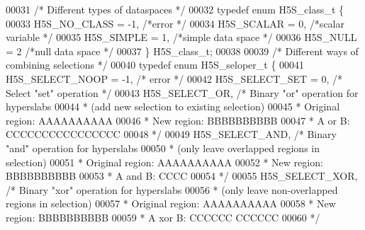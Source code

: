 \begin{DoxyCode}
00031 \textcolor{comment}{/* Different types of dataspaces */}
00032 \textcolor{keyword}{typedef} \textcolor{keyword}{enum} H5S\_class\_t \{
00033     H5S\_NO\_CLASS         = -1,  \textcolor{comment}{/*error                                      */}
00034     H5S\_SCALAR           = 0,   \textcolor{comment}{/*scalar variable                            */}
00035     H5S\_SIMPLE           = 1,   \textcolor{comment}{/*simple data space                          */}
00036     H5S\_NULL             = 2    \textcolor{comment}{/*null data space                            */}
00037 \} H5S\_class\_t;
00038 
00039 \textcolor{comment}{/* Different ways of combining selections */}
00040 \textcolor{keyword}{typedef} \textcolor{keyword}{enum} H5S\_seloper\_t \{
00041     H5S\_SELECT\_NOOP      = -1,  \textcolor{comment}{/* error                                     */}
00042     H5S\_SELECT\_SET       = 0,   \textcolor{comment}{/* Select "set" operation            */}
00043     H5S\_SELECT\_OR,              \textcolor{comment}{/* Binary "or" operation for hyperslabs}
00044 \textcolor{comment}{                                 * (add new selection to existing selection)}
00045 \textcolor{comment}{                                 * Original region:  AAAAAAAAAA}
00046 \textcolor{comment}{                                 * New region:             BBBBBBBBBB}
00047 \textcolor{comment}{                                 * A or B:           CCCCCCCCCCCCCCCC}
00048 \textcolor{comment}{                                 */}
00049     H5S\_SELECT\_AND,             \textcolor{comment}{/* Binary "and" operation for hyperslabs}
00050 \textcolor{comment}{                                 * (only leave overlapped regions in selection)}
00051 \textcolor{comment}{                                 * Original region:  AAAAAAAAAA}
00052 \textcolor{comment}{                                 * New region:             BBBBBBBBBB}
00053 \textcolor{comment}{                                 * A and B:                CCCC}
00054 \textcolor{comment}{                                 */}
00055     H5S\_SELECT\_XOR,             \textcolor{comment}{/* Binary "xor" operation for hyperslabs}
00056 \textcolor{comment}{                                 * (only leave non-overlapped regions in selection)}
00057 \textcolor{comment}{                                 * Original region:  AAAAAAAAAA}
00058 \textcolor{comment}{                                 * New region:             BBBBBBBBBB}
00059 \textcolor{comment}{                                 * A xor B:          CCCCCC    CCCCCC}
00060 \textcolor{comment}{                                 */}

\end{DoxyCode}
